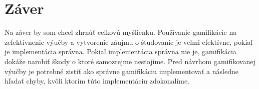 \documentclass[10pt,oneside,slovak,a4paper]{article}
\begin{document}
\section{Záver} \label{Zaver} %
Na záver by som chcel zhrnúť celkovú myšlienku. Používanie gamifikácie na zefektívnenie výučby a vytvorenie záujmu o študovanie je veľmi efektívne, pokiaľ je implementácia správna. Pokiaľ implementácia správna nie je, gamifikácia dokáže narobiť škody o ktoré samozrejme nestojíme. Pred návrhom gamifikovanej výučby je potrebné zistiť ako správne gamifikáciu implementovať a následne hľadať chyby, kvôli ktorím túto implementáciu zdokonalíme.





\end{document}
